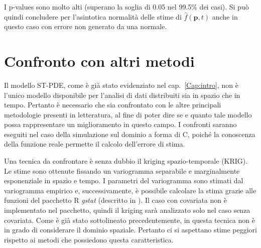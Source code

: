 \documentclass[a4paper,11pt,twoside,openright]{book}							%
\begin{document}
I p-values sono molto alti (superano la soglia di 0.05 nel 99.5\% dei casi). Si può quindi concludere per l'asintotica normalità delle stime di $\hat{f}(\bm p,t)$ anche in questo caso con errore non generato da una normale.
\newpage
\thispagestyle{empty}
\chapter{Confronto con altri metodi}
\label{cap:confronto}

Il modello ST-PDE, come è già stato evidenziato nel cap.~\ref{Cap:intro}, non è l'unico modello disponibile per l'analisi di dati distribuiti sia in spazio che in tempo. Pertanto è necessario che sia confrontato con le altre principali metodologie presenti in letteratura, al fine di poter dire se e quanto tale modello possa rappresentare un miglioramento in questo campo. I confronti saranno eseguiti nel caso della simulazione sul dominio a forma di C, poiché la conoscenza della funzione reale permette il calcolo dell'errore di stima. 

Una tecnica da confrontare è senza dubbio il kriging spazio-temporale (KRIG). Le stime sono ottenute fissando un variogramma separabile e marginalmente esponenziale in spazio e tempo. I parametri del variogramma sono stimati dal variogramma empirico e, successivamente, è possibile calcolare la stima grazie alle funzioni del pacchetto R \textit{gstat} (descritto in \cite{package:gstat}). Il caso con covariata non è implementato nel pacchetto, quindi il kriging sarà analizzato solo nel caso senza covariata. Come è già stato sottolineato precedentemente, in questa tecnica non è in grado di considerare il dominio spaziale. Pertanto ci si aspettano stime peggiori rispetto ai metodi che possiedono questa caratteristica.
\end{document}
